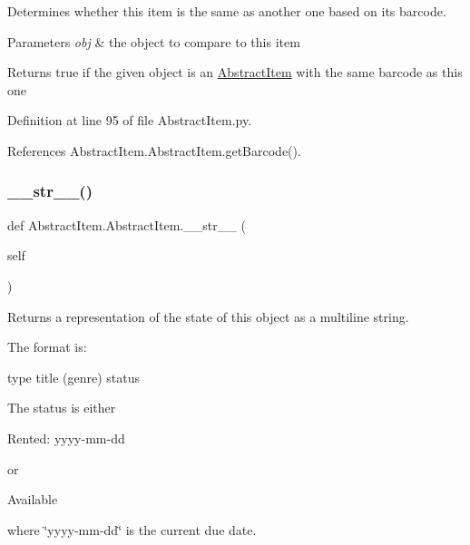 Determines whether this item is the same as another one based on its barcode. 


\begin{DoxyParams}{Parameters}
{\em obj} & the object to compare to this item \\
\hline
\end{DoxyParams}
\begin{DoxyReturn}{Returns}
true if the given object is an \hyperlink{classAbstractItem_1_1AbstractItem}{Abstract\+Item} with the same barcode as this one 
\end{DoxyReturn}


Definition at line 95 of file Abstract\+Item.\+py.



References Abstract\+Item.\+Abstract\+Item.\+get\+Barcode().

\mbox{\label{classAbstractItem_1_1AbstractItem_ac55364df8cb3e7a488842409c372d634}} 
\subsubsection{\texorpdfstring{\+\_\+\+\_\+str\+\_\+\+\_\+()}{\_\_str\_\_()}}
{\footnotesize\ttfamily def Abstract\+Item.\+Abstract\+Item.\+\_\+\+\_\+str\+\_\+\+\_\+ (\begin{DoxyParamCaption}\item[{}]{self }\end{DoxyParamCaption})}



Returns a representation of the state of this object as a multiline string. 

The format is\+: 
\begin{DoxyPre}
    type
    title
    (genre)
    status
  \end{DoxyPre}
 The status is either 
\begin{DoxyPre}
    Rented: yyyy-mm-dd
  \end{DoxyPre}
 or 
\begin{DoxyPre}
    Available
  \end{DoxyPre}
 where \char`\"{}yyyy-\/mm-\/dd\char`\"{} is the current due date.

